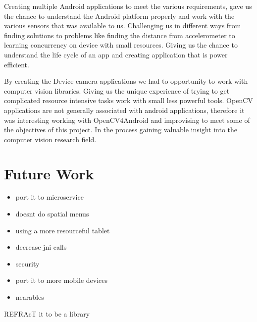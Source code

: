 Creating multiple Android applications to meet the various requirements, gave us the chance to understand the Android platform properly and work with the various sensors that was available to us. Challenging us in different ways from finding solutions to problems like finding the distance from accelerometer to learning concurrency on device with small resources. Giving us the chance to understand the life cycle of an app and creating application that is power efficient.

By creating the Device camera applications we had to opportunity to work with computer vision libraries. Giving us the unique experience of trying to get complicated resource intensive tasks work with small less powerful tools. OpenCV applications are not generally associated with android applications, therefore it was interesting working with OpenCV4Android and improvising to meet some of the objectives of this project. In the process gaining valuable insight into the computer vision research field.

\section{Future Work}
\begin{itemize}
\item port it to microservice
\item doesnt do spatial menus
\item using a more resourceful tablet
\item decrease jni calls
\item security
\item port it to more mobile devices
\item nearables
\end{itemize}

REFRAcT it to be a library 